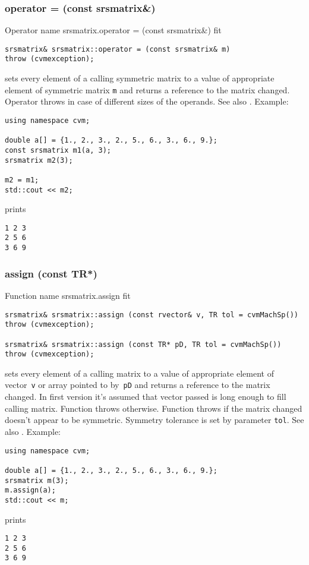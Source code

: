 \subsubsection{operator = (const srsmatrix\&)}
Operator%
\pdfdest name {srsmatrix.operator = (const srsmatrix&)} fit
\begin{verbatim}
srsmatrix& srsmatrix::operator = (const srsmatrix& m)
throw (cvmexception);
\end{verbatim}
sets every element of a calling symmetric matrix to a value of
appropriate element of symmetric matrix \verb"m"
and returns a reference to
the matrix changed.
Operator throws  
in case of different sizes of the operands.
See also .
Example:
\begin{Verbatim}
using namespace cvm;

double a[] = {1., 2., 3., 2., 5., 6., 3., 6., 9.};
const srsmatrix m1(a, 3);
srsmatrix m2(3);

m2 = m1;
std::cout << m2;
\end{Verbatim}
prints
\begin{Verbatim}
1 2 3
2 5 6
3 6 9
\end{Verbatim}
\newpage



\subsubsection{assign (const TR*)}
Function%
\pdfdest name {srsmatrix.assign} fit
\begin{verbatim}
srsmatrix& srsmatrix::assign (const rvector& v, TR tol = cvmMachSp())
throw (cvmexception);

srsmatrix& srsmatrix::assign (const TR* pD, TR tol = cvmMachSp())
throw (cvmexception);
\end{verbatim}
sets every element of a calling matrix to a value of
appropriate element of  vector~\verb'v'
or  array pointed to by~\verb"pD"
and returns a reference to
the matrix changed.
In first version it's assumed that vector passed is long
enough to fill calling matrix. Function throws  
otherwise.
Function throws  
if the matrix changed doesn't appear to be symmetric.
Symmetry tolerance is set by parameter \verb'tol'.
See also .
Example:
\begin{Verbatim}
using namespace cvm;

double a[] = {1., 2., 3., 2., 5., 6., 3., 6., 9.};
srsmatrix m(3);
m.assign(a);
std::cout << m;
\end{Verbatim}
prints
\begin{Verbatim}
1 2 3
2 5 6
3 6 9
\end{Verbatim}
\newpage



